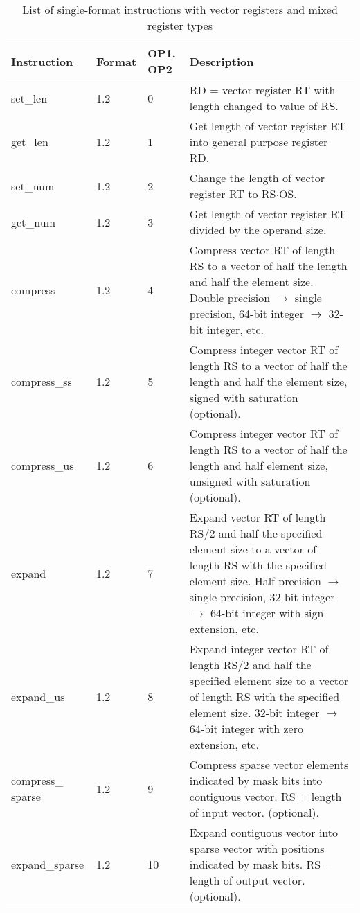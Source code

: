 \documentclass[forwardcom.tex]{subfiles}
\begin{document}
\begin{longtable} {|p{20mm}|p{10mm}|p{8mm}|p{75mm}|}
\caption{List of single-format instructions with vector registers and mixed register types} 
\label{table:ListOfSingleFormatInstructionsVector} \\
\endfirsthead
\endhead
\hline
\bfseries Instruction & \bfseries Format &\bfseries OP1. OP2 & \bfseries Description \\
\hline
set\_len      & 1.2 &  0 & RD = vector register RT with length changed to value of RS. \\
get\_len      & 1.2 &  1 & Get length of vector register RT into general purpose register RD. \\
set\_num      & 1.2 &  2 & Change the length of vector register RT to RS$\cdot$OS. \\
get\_num      & 1.2 &  3 & Get length of vector register RT divided by the operand size. \\
compress      & 1.2 &  4 & Compress vector RT of length RS to a vector of half the length and half the element size. Double precision $\rightarrow$ single precision, 64-bit
integer $\rightarrow$ 32-bit integer, etc. \\
compress\_ss  & 1.2 &  5 & Compress integer vector RT of length RS to a vector of half the length and half the element size, signed with saturation (optional). \\
compress\_us  & 1.2 &  6 & Compress integer vector RT of length RS to a vector of half the length and half element size, unsigned with saturation (optional). \\
expand        & 1.2 &  7 & Expand vector RT of length RS/2 and half the specified element size to a vector of length RS with the specified element size. Half
precision $\rightarrow$ single precision, 32-bit integer $\rightarrow$ 64-bit integer with sign extension, etc. \\
expand\_us    & 1.2 &  8 & Expand integer vector RT of length RS/2 and half the specified element size to a vector of length RS with the specified element
size. 32-bit integer $\rightarrow$ 64-bit integer with zero extension, etc. \\
compress\_ sparse&1.2 &  9 & Compress sparse vector elements indicated by mask bits into contiguous vector. RS = length of input vector. (optional). \\
expand\_sparse& 1.2 & 10 & Expand contiguous vector into sparse vector with positions
indicated by mask bits. RS = length of output vector. (optional). \\

\end{longtable}
\end{document}
